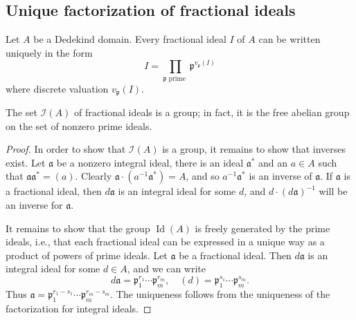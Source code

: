\documentclass[12pt, oneside]{book}
\begin{document}
\subsection{Unique factorization of fractional ideals} %
\begin{theorem}
    Let $A$ be a Dedekind domain.
    Every fractional ideal $I$ of $A$ can be written uniquely in the form
    \begin{equation*}
        I=\prod_{\mathfrak{p} \text{ prime }} \mathfrak{p}^{v_\mathfrak{p}(I)}
    \end{equation*}
    where discrete valuation $v_\mathfrak{p}(I)$.

    The set $\mathcal{I}(A)$ of fractional ideals is a group; in fact, it is the free abelian group on the set of nonzero prime ideals.
    \begin{proof}
        In order to show that $\mathcal{I}(A)$ is a group, it remains to show that inverses exist.
        Let $\mathfrak{a}$ be a nonzero integral ideal, there is an ideal $\mathfrak{a}^*$ and an $a \in A$ such that $\mathfrak{a} \mathfrak{a}^*=(a)$. Clearly $\mathfrak{a} \cdot\left(a^{-1} \mathfrak{a}^*\right)=A$, and so $a^{-1} \mathfrak{a}^*$ is an inverse of $\mathfrak{a}$. If $\mathfrak{a}$ is a fractional ideal, then $d \mathfrak{a}$ is an integral ideal for some $d$, and $d \cdot(d \mathfrak{a})^{-1}$ will be an inverse for $\mathfrak{a}$.

        It remains to show that the group $\operatorname{Id}(A)$ is freely generated by the prime ideals, i.e., that each fractional ideal can be expressed in a unique way as a product of powers of prime ideals. Let $\mathfrak{a}$ be a fractional ideal. Then $d \mathfrak{a}$ is an integral ideal for some $d \in A$, and we can write
        \begin{equation*}
            d \mathfrak{a}=\mathfrak{p}_1^{r_1} \cdots \mathfrak{p}_m^{r_m}, \quad(d)=\mathfrak{p}_1^{s_1} \cdots \mathfrak{p}_m^{s_m} .
        \end{equation*}
        Thus $\mathfrak{a}=\mathfrak{p}_1^{r_1-s_1} \cdots \mathfrak{p}_m^{r_m-s_m}$. The uniqueness follows from the uniqueness of the factorization for integral ideals.
    \end{proof}
\end{theorem}
\end{document}
